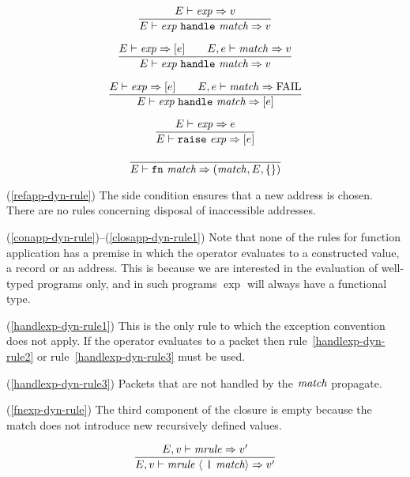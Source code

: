 \begin{equation}        %
\label{handlexp-dyn-rule1}
\frac{\E\ts\exp\ra\V}
     {\E\ts\handlexp\ra\V}
\end{equation}

\begin{equation}        %
\label{handlexp-dyn-rule2}
\frac{\E\ts\exp\ra[\exval]\qquad\E,\exval\ts\match\ra\V}
     {\E\ts\handlexp\ra\V}
\end{equation}

\begin{equation}        %
\label{handlexp-dyn-rule3}
\frac{\E\ts\exp\ra[\exval]\qquad\E,\exval\ts\match\ra\FAIL}
     {\E\ts\handlexp\ra[\exval]}
\end{equation}

\begin{equation}        %
\frac{\E\ts\exp\ra\exval}
     {\E\ts\raisexp\ra[\exval]}
\end{equation}

\begin{equation}        %
\label{fnexp-dyn-rule}
\frac{}
     {\E\ts\fnexp\ra(\match,\E,\emptymap)}
\end{equation}
\comments
\begin{description}
\item{(\ref{refapp-dyn-rule})}
  The side condition ensures that a new address is chosen. There are
no rules concerning disposal of inaccessible addresses.
%
\item{(\ref{conapp-dyn-rule})--(\ref{closapp-dyn-rule1})}
  Note that none of the rules for function application has a
premise in which the operator evaluates to a constructed
value, a record or an address. This is because we are interested
in the evaluation of well-typed programs only, and in such programs $\exp$
will always have a functional type.
%
\pagebreak
\item{(\ref{handlexp-dyn-rule1})}
  This is the only rule to which the exception convention does not apply.
If the operator evaluates to a packet then rule~\ref{handlexp-dyn-rule2}
or rule~\ref{handlexp-dyn-rule3} must be used.
%
\item{(\ref{handlexp-dyn-rule3})}
 Packets that are not handled by the ${\it match}$ propagate.
%
\item{(\ref{fnexp-dyn-rule})}
  The third component of the  closure is empty because the match does not
introduce new recursively defined values.
\end{description}
%
%
\begin{equation}	%
\frac{\E,\V\ts\mrule\ra\V'}
     {\E,\V\ts\longmatch\ra\V'}\index{54.1}
\end{equation}

